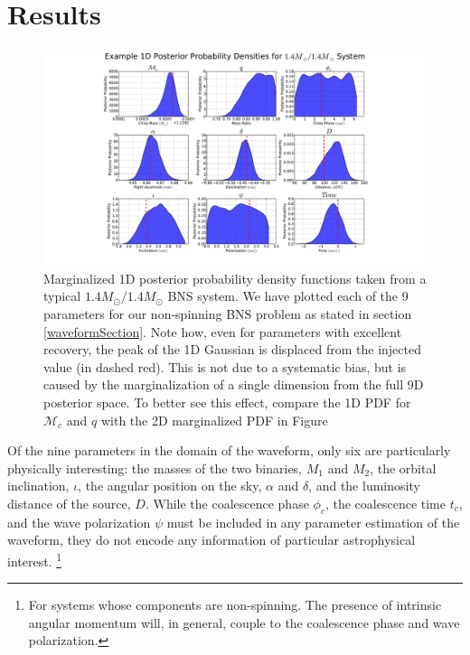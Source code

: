 \documentclass[11pt,a4paper]{emulateapj}
\begin{document}
\section{Results}
\label{resultsSection} 

\begin{figure}[t!]
\centering
\includegraphics[trim=7cm 0cm 0cm 0cm, clip=true,scale=0.55]{9dpdf.pdf}
\caption{Marginalized 1D posterior probability density functions taken from a typical 
$1.4M_{\odot}/1.4M_{\odot}$ BNS system.  We have plotted each of the 9 parameters for 
our non-spinning BNS problem as stated in section \ref{waveformSection}.  Note how, 
even for parameters with excellent recovery, the peak of the 1D Gaussian is displaced from 
the injected value (in dashed red).  This is not due to a systematic bias, but is caused by the 
marginalization of a single dimension from the full 9D posterior space.  To better see this effect, 
compare the 1D PDF for $\mathcal{M}_{c}$ and $q$ with the 2D marginalized PDF in Figure~\label{9dPDF}}
\end{figure}

Of the nine parameters in the domain of the waveform, only six are particularly physically
interesting: the masses of the two binaries, $M_1$ and $M_2$, the orbital inclination,
$\iota$, the angular position on the sky, $\alpha$ and $\delta$, and the luminosity 
distance of the source, $D$.  While the coalescence phase $\phi_c$, the coalescence time
$t_c$, and the wave polarization $\psi$ must be included in any parameter estimation of the 
waveform, they do not encode any information of particular astrophysical interest.
\footnote{For systems whose components are non-spinning.  The presence of intrinsic angular 
momentum will, in general, couple to the coalescence phase and wave polarization.}   
\end{document}
